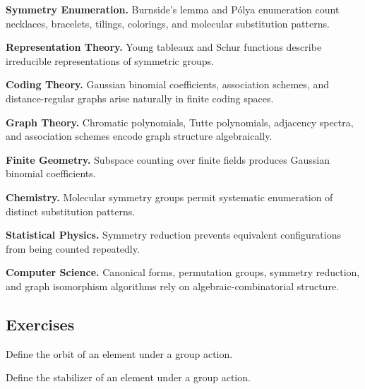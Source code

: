 \begin{applicationbox}

\textbf{Symmetry Enumeration.}
Burnside's lemma and P\'olya enumeration count necklaces, bracelets,
tilings, colorings, and molecular substitution patterns.

\medskip

\textbf{Representation Theory.}
Young tableaux and Schur functions describe irreducible representations
of symmetric groups.

\medskip

\textbf{Coding Theory.}
Gaussian binomial coefficients, association schemes, and
distance-regular graphs arise naturally in finite coding spaces.

\medskip

\textbf{Graph Theory.}
Chromatic polynomials, Tutte polynomials, adjacency spectra, and
association schemes encode graph structure algebraically.

\medskip

\textbf{Finite Geometry.}
Subspace counting over finite fields produces Gaussian binomial
coefficients.

\medskip

\textbf{Chemistry.}
Molecular symmetry groups permit systematic enumeration of distinct
substitution patterns.

\medskip

\textbf{Statistical Physics.}
Symmetry reduction prevents equivalent configurations from being
counted repeatedly.

\medskip

\textbf{Computer Science.}
Canonical forms, permutation groups, symmetry reduction, and graph
isomorphism algorithms rely on algebraic-combinatorial structure.

\end{applicationbox}

\subsection{Exercises}
\label{subsec:algebraic-combinatorics-exercises}

\begin{exercise}[1]
Define the orbit of an element under a group action.
\end{exercise}

\begin{exercise}[1]
Define the stabilizer of an element under a group action.
\end{exercise}

